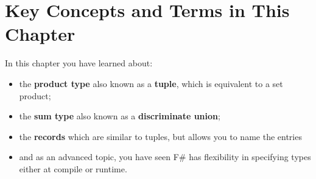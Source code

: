 \documentclass[fsharpNotes.tex]{subfiles}
\begin{document}
\section{Key Concepts and Terms in This Chapter}
In this chapter you have learned about:
\begin{itemize}
\item the \textbf{product type} also known as a \textbf{tuple}, which is equivalent to a set product;
\item the \textbf{sum type} also known as a \textbf{discriminate union};
\item the \textbf{records} which are similar to tuples, but allows you to name the entries
\item and as an advanced topic, you have seen F\# has flexibility in specifying types either at compile or runtime.
\end{itemize}
\end{document}
